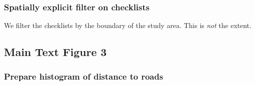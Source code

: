 \documentclass[]{article}
\newenvironment{Shaded}{}{}
\newcommand{\CommentTok}[1]{\textcolor[rgb]{0.00,0.50,0.00}{#1}}
\newcommand{\DataTypeTok}[1]{#1}
\newcommand{\DecValTok}[1]{#1}
\newcommand{\KeywordTok}[1]{\textcolor[rgb]{0.00,0.00,1.00}{#1}}
\newcommand{\NormalTok}[1]{#1}
\newcommand{\OperatorTok}[1]{#1}
\newcommand{\StringTok}[1]{\textcolor[rgb]{0.00,0.50,0.50}{#1}}
\begin{document}
\hypertarget{spatially-explicit-filter-on-checklists-1}{%
\subsubsection{Spatially explicit filter on checklists}\label{spatially-explicit-filter-on-checklists-1}}

We filter the checklists by the boundary of the study area. This is \emph{not} the extent.

\begin{Shaded}
\end{Shaded}

\hypertarget{main-text-figure-3}{%
\subsection{Main Text Figure 3}\label{main-text-figure-3}}

\hypertarget{prepare-histogram-of-distance-to-roads}{%
\subsubsection{Prepare histogram of distance to roads}\label{prepare-histogram-of-distance-to-roads}}
\end{document}
